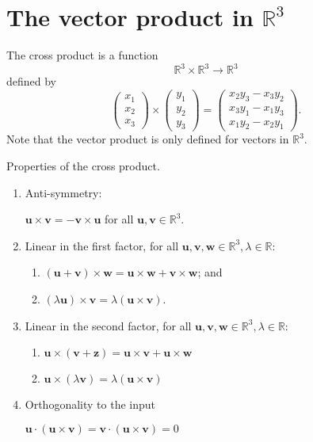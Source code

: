 \section{The vector product in $\mathbb R^3$}

\begin{definition}
    The cross product is a function
    \[\mathbb R^3\times\mathbb R^3\to\mathbb R^3\]
    defined by
    \[
        \begin{pmatrix}
            x_1\\x_2\\x_3
        \end{pmatrix}
        \times
        \begin{pmatrix}
            y_1\\y_2\\y_3
        \end{pmatrix}
        =
        \begin{pmatrix}
            x_2y_3-x_3y_2\\
            x_3y_1-x_1y_3\\
            x_1y_2-x_2y_1
        \end{pmatrix}
        .
    \]
    Note that the vector product is only defined for vectors in $\mathbb R^3$.
\end{definition}

\begin{lemma}
    Properties of the cross product.
    \begin{enumerate}
        \item Anti-symmetry:
        
        $\bm u\times\bm v=-\bm v\times\bm u$ for all $\bm u,\bm v\in\mathbb R^3$.
        
        \item Linear in the first factor, for all $\bm u,\bm v,\bm w\in\mathbb R^3,\lambda\in\mathbb R$:
        \begin{enumerate}
            \item $(\bm u+\bm v)\times\bm w=\bm u\times\bm w+\bm v\times\bm w$; and
            \item $(\lambda\bm u)\times\bm v=\lambda(\bm u\times\bm v)$.
        \end{enumerate}
        
        \item Linear in the second factor, for all $\bm u,\bm v,\bm w\in\mathbb R^3,\lambda\in\mathbb R$:
        \begin{enumerate}
            \item $\bm u\times(\bm v+\bm z)=\bm u\times\bm v+\bm u\times\bm w$
            \item $\bm u\times(\lambda\bm v)=\lambda(\bm u\times\bm v)$
        \end{enumerate}
        
        \item Orthogonality to the input
        
        $\bm u\cdot(\bm u\times\bm v)=\bm v\cdot(\bm u\times\bm v)=0$
    \end{enumerate}
\end{lemma}

